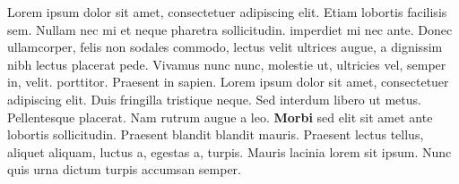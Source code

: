 \documentclass{memoir}
\begin{document}
\setcounter{page}{637}
\beginnumbering
\pstart
{}Lorem ipsum dolor sit amet, consectetuer adipiscing elit. Etiam
lobortis facilisis sem. Nullam nec mi et neque pharetra
sollicitudin.  imperdiet mi nec ante. Donec ullamcorper,
felis non sodales commodo, lectus velit ultrices augue, a
dignissim nibh lectus placerat pede. Vivamus nunc nunc, molestie
ut, ultricies vel, semper in, velit.  porttitor. Praesent in
sapien. Lorem ipsum dolor sit amet, consectetuer adipiscing elit.
Duis fringilla tristique neque. Sed interdum libero ut metus.
Pellentesque placerat. Nam rutrum augue a leo. \textbf{Morbi} sed elit sit
amet ante lobortis sollicitudin. Praesent blandit blandit mauris.
Praesent lectus tellus, aliquet aliquam, luctus a, egestas a,
turpis. Mauris lacinia lorem sit ipsum. Nunc quis urna dictum
turpis accumsan semper.
\pend
\endnumbering
\printindex[test]
\end{document}
